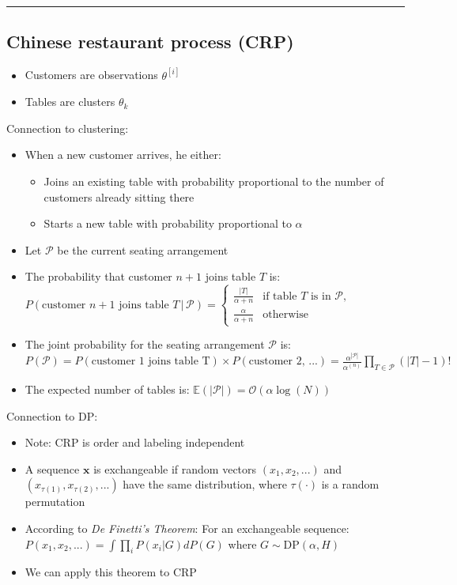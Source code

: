 {\color{black}\hrule height 0.001mm}

\subsection*{Chinese restaurant process (CRP)}
\begin{itemize}
    \item Customers are observations $\theta^{[i]}$
    \item Tables are clusters $\theta_k$
\end{itemize}
Connection to clustering:
\begin{itemize}
    \item When a new customer arrives, he either:
    \begin{itemize}
        \item Joins an existing table with probability proportional to the number of customers already sitting there
        \item Starts a new table with probability proportional to $\alpha$
    \end{itemize}
    \item Let $\mathcal{P}$ be the current seating arrangement
    \item The probability that customer $n+1$ joins table $T$ is:
    $P(\textrm{customer } n+1 \textrm{ joins table } T \, | \, \mathcal{P}) = 
    \begin{cases} 
    \frac{|T|}{\alpha + n} & \textrm{if table } T \textrm{ is in } \mathcal{P}, \\
    \frac{\alpha}{\alpha + n} & \textrm{otherwise}
    \end{cases}$
    \item The joint probability for the seating arrangement $\mathcal{P}$ is:
    $P(\mathcal{P}) = P(\textrm{customer 1 joins table T}) \times P(\textrm{customer 2, ...}) = \frac{\alpha^{|\mathcal{P}|}}{\alpha^{(n)}} \prod_{T \in \mathcal{P}} (|T| - 1)!$
    \item The expected number of tables is:
    $\mathbb{E}(|\mathcal{P}|) = \mathcal{O}(\alpha \log(N))$
\end{itemize}
Connection to DP:
\begin{itemize}
    \item Note: CRP is order and labeling independent
    \item A sequence $\boldsymbol{x}$ is exchangeable if random vectors $(x_1, x_2, ...)$ and $(x_{\tau(1)}, x_{\tau(2)}, ...)$ have the same distribution, where $\tau(\cdot)$ is a random permutation
    \item According to \emph{De Finetti's Theorem}: For an exchangeable sequence:
    $P(x_1, x_2, ...) = \int \prod_i P(x_i | G) dP(G)$
    where $G \sim \textrm{DP}(\alpha, H)$
    \item We can apply this theorem to CRP
\end{itemize}
